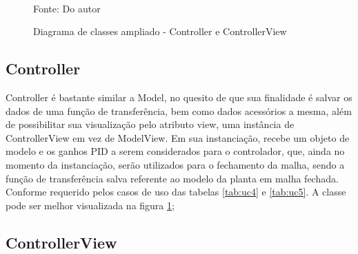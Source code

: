 \begin{figure}[H]
    \centering
    \caption{Diagrama de classes ampliado - Controller e ControllerView}
    \label{fig:class_diag_controller}
    \\
    \vspace{0cm}\hspace{0cm}\small{Fonte: Do autor}
\end{figure}

\subsection{Controller}

Controller é bastante similar a Model, no quesito de que sua finalidade é salvar os dados de uma função de
transferência, bem como dados acessórios a mesma, além de possibilitar sua visualização pelo atributo view, uma
instância de ControllerView em vez de ModelView.
Em sua instanciação, recebe um objeto de modelo e os ganhos PID a serem considerados para o controlador, que, ainda no
momento da instanciação, serão utilizados para o fechamento da malha, sendo a função de transferência salva referente
ao modelo da planta em malha fechada.
Conforme requerido pelos casos de uso das tabelas \ref{tab:uc4} e \ref{tab:uc5}.
A classe pode ser melhor visualizada na figura \ref{fig:class_diag_controller};

\subsection{ControllerView}

